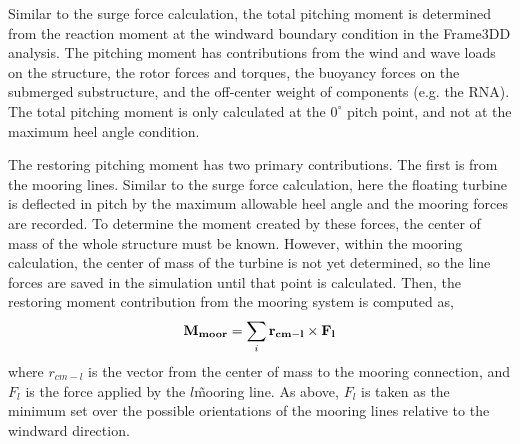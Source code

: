 Similar to the surge force calculation, the total pitching moment is
determined from the reaction moment at the windward boundary condition
in the Frame3DD analysis.  The pitching moment has contributions from
the wind and wave loads on the structure, the rotor forces and torques,
the buoyancy forces on the submerged substructure, and the off-center
weight of components (e.g. the RNA).  The total pitching moment is only
calculated at the $0^{\circ}$ pitch point, and not at the maximum heel
angle condition.

The restoring pitching moment has two primary contributions.  The first
is from the mooring lines.  Similar to the surge force calculation, here
the floating turbine is deflected in pitch by the maximum allowable heel
angle and the mooring forces are recorded.  To determine the moment
created by these forces, the center of mass of the whole structure must
be known.  However, within the mooring calculation, the center of mass
of the turbine is not yet determined, so the line forces are saved in
the simulation until that point is calculated.  Then, the restoring moment
contribution from the mooring system is computed as,
\[
  \mathbf{M_{moor}} = \sum_i \mathbf{r_{cm-l}} \times \mathbf{F_l}
\]
where $r_{cm-l}$ is the vector from the center of mass to the mooring
connection, and $F_l$ is the force applied by the $l$\th\~mooring
line.  As above, $F_l$ is taken as the minimum set over the possible
orientations of the mooring lines relative to the windward direction.

